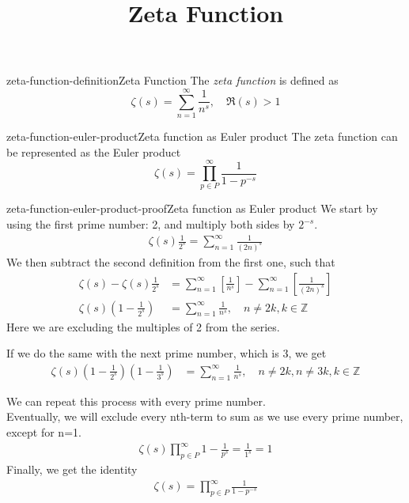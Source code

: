 \documentclass[preview]{standalone}
\begin{document}
\title{Zeta Function}
\genpage


\begin{snippetdefinition}{zeta-function-definition}{Zeta Function}
    The \textit{zeta function} is defined as
    \[
        \zeta(s)=\sum_{n=1}^{\infty}\frac{1}{n^s},\quad \Re(s)>1
    \]
\end{snippetdefinition}

\begin{snippettheorem}{zeta-function-euler-product}{Zeta function as Euler product}
    The zeta function can be represented as the Euler product
    \[
        \zeta(s)=\prod_{p\in P}^{\infty}\frac{1}{1-p^{-s}}
    \]
\end{snippettheorem}

\begin{snippetproof}{zeta-function-euler-product-proof}{Zeta function as Euler product}
    We start by using the first prime number: 2, and multiply both sides by \(2^{-s}\).
    \begin{align*}
        \zeta(s)\frac{1}{2^s}=\sum_{n=1}^{\infty}\frac{1}{{(2n)}^s}
    \end{align*}
    We then subtract the second definition from the first one, such that
    \begin{align*}
        \zeta(s)-\zeta(s)\frac{1}{2^s}&=
        \sum_{n=1}^{\infty}\left[\frac{1}{n^s}\right]-
        \sum_{n=1}^{\infty}\left[\frac{1}{{(2n)}^s}\right]
        \\
        \zeta(s)\left(1-\frac{1}{2^s}\right)&=
        \sum_{n=1}^{\infty}\frac{1}{n^s},
        \quad n\neq 2k,k\in \mathbb{Z}
    \end{align*}
    Here we are excluding the multiples of 2 from the series.
    
    If we do the same with the next prime number, which is 3, we get
    \begin{align*}
        \zeta(s)\left(1-\frac{1}{2^s}\right)\left(1-\frac{1}{3^s}\right)&=
        \sum_{n=1}^{\infty}\frac{1}{n^s},
        \quad n\neq 2k,n\neq 3k, k\in \mathbb{Z}
    \end{align*}
    
    We can repeat this process with every prime number.
    \\
    Eventually, we will exclude every nth-term to sum as we use every prime number, except for n=1.
    \begin{align*}
        \zeta(s)\prod_{p\in P}^{\infty}1-\frac{1}{p^s}=\frac{1}{1^s}=1
    \end{align*}
    Finally, we get the identity
    \begin{align*}
        \zeta(s)=
        \prod_{p\in P}^{\infty}\frac{1}{1-p^{-s}}
    \end{align*}
\end{snippetproof}
\end{document}

